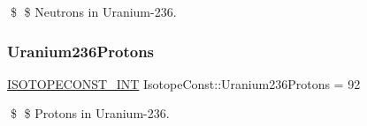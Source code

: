 \$ \$ Neutrons in Uranium-\/236. \mbox{\label{group___isotope_const-_uranium-_u236_ga0eeb5f96a11e1b805b573423b3c13ffb}} 
\subsubsection{\texorpdfstring{Uranium236\+Protons}{Uranium236Protons}}
{\footnotesize\ttfamily \mbox{\hyperlink{group___isotope_const-_macros_ga5f18360b3e99483a35c32d789e62621c}{I\+S\+O\+T\+O\+P\+E\+C\+O\+N\+S\+T\+\_\+\+I\+NT}} Isotope\+Const\+::\+Uranium236\+Protons = 92}

\$ \$ Protons in Uranium-\/236. 